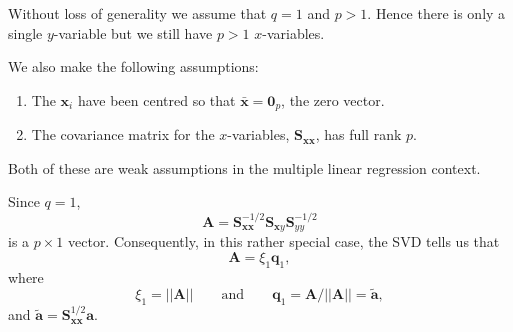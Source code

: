 \documentclass[]{book}
\providecommand{\tightlist}{%
  \setlength{\itemsep}{0pt}\setlength{\parskip}{0pt}}
\theoremstyle{definition}
\theoremstyle{definition}
\theoremstyle{definition}
\theoremstyle{remark}
\begin{document}
Without loss of generality we assume that \(q=1\) and \(p>1\). Hence there is only a single \(y\)-variable but we still have \(p>1\) \(x\)-variables.

We also make the following assumptions:

\begin{enumerate}
\def\labelenumi{\arabic{enumi}.}
\tightlist
\item
  The \(\boldsymbol x_i\) have been centred so that \(\bar{\boldsymbol x}={\mathbf 0}_p\), the zero vector.
\item
  The covariance matrix for the \(x\)-variables, \(\boldsymbol S_{\boldsymbol x\boldsymbol x}\), has full rank \(p\).
\end{enumerate}

Both of these are weak assumptions in the multiple linear regression context.

Since \(q=1\),
\[
\boldsymbol A=\boldsymbol S_{\boldsymbol x\boldsymbol x}^{-1/2} \boldsymbol S_{\boldsymbol xy}\boldsymbol S_{yy}^{-1/2}
\]
is a \(p \times 1\) vector. Consequently, in this rather special case,
the SVD tells us that
\[
\boldsymbol A=\xi_1 \boldsymbol q_1,
\]
where
\[
\xi_1=\vert \vert \boldsymbol A\vert \vert \qquad \text{and} \qquad \boldsymbol q_1=\boldsymbol A/\vert \vert \boldsymbol A\vert \vert=\tilde{\boldsymbol a},
\]
and \(\tilde{\boldsymbol a}=\boldsymbol S_{\boldsymbol x\boldsymbol x}^{1/2} \boldsymbol a\).
\end{document}
